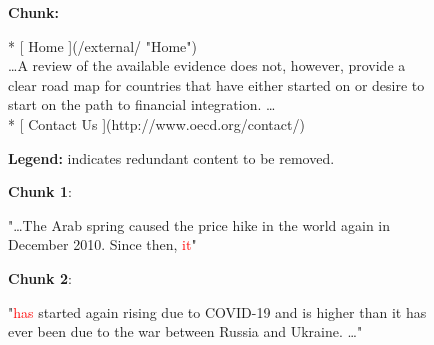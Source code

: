 \documentclass[11pt]{article}
\begin{document}
\begin{figure}[t]
    \centering

    \begin{tcolorbox}[
        title=Case 1: Content Redundancy,
        coltitle=white,
        colback=gray!5!white,
        colframe=black,
        colbacktitle=black,
        boxrule=0.8pt,
        fonttitle=\bfseries\small,
        fontupper=\footnotesize,
        arc=2pt,
        width=\textwidth,
        left=6pt, right=6pt, top=6pt, bottom=6pt
    ]
    {\textbf{Chunk: }}
    
    \colorbox{red!30}{* [ Home ](/external/ "Home")} \\
    \ldots A review of the available evidence does not, however, provide a clear road map for countries that have either started on or desire to start on the path to financial integration. \ldots \\
    \colorbox{red!30}{* [ Contact Us ](http://www.oecd.org/contact/)}
    
    \vspace{6pt}
    
    \noindent
    \textbf{Legend:} \colorbox{red!30}{\phantom{xx}} indicates redundant  content to be removed.
    \end{tcolorbox}

    \begin{tcolorbox}[
        title=Case 2: Text Semantic Continuity Disruption,
        coltitle=white,
        colback=gray!5!white,
        colframe=black,
        colbacktitle=black,
        boxrule=0.8pt,
        fonttitle=\bfseries\small,
        fontupper=\footnotesize,
        arc=2pt,
        width=\textwidth,
        left=6pt, right=6pt, top=6pt, bottom=6pt
    ]
    
    \begin{minipage}[t]{0.48\textwidth}
    {\textbf{Chunk 1}}:  
    
    "\ldots The Arab spring caused the price hike in the world again in December 2010. Since then, \textcolor{red}{it}"
    \end{minipage}%
    \hfill
    \begin{minipage}[t]{0.48\textwidth}
    \textbf{Chunk 2}:
    
    "\textcolor{red}{has} started again rising due to COVID-19 and is higher than it has ever been due to the war between Russia and Ukraine. \ldots"
    \end{minipage}


\end{tcolorbox}
\end{figure}
\end{document}
